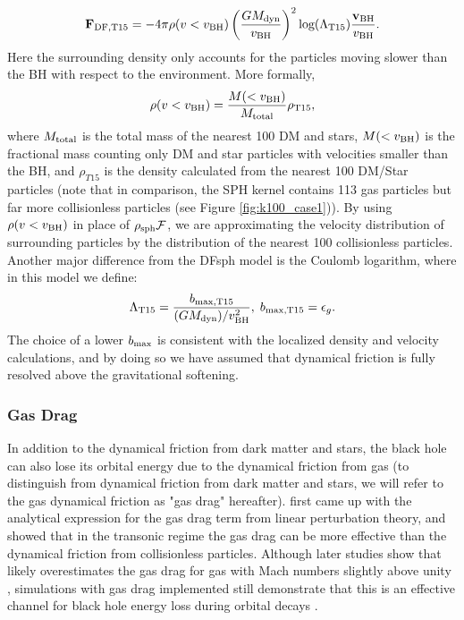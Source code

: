 \begin{equation}
    \label{eq:T15}
    \mathbf{F}_{\rm DF,T15} = -4\pi \rho (v<v_{\rm BH}) \left(\frac{GM_{\rm dyn}}{v_{\rm BH}}\right)^2  \text{log}(\Lambda_{\rm T15}) \frac{\bf{v}_{\rm BH}}{v_{\rm BH}}.
\end{equation}
Here the surrounding density only accounts for the particles moving slower than the BH with respect to the environment. More formally,
\begin{equation}
\label{eq:rho}
    \rho (v<v_{\rm BH}) = \frac{M(<v_{\rm BH})}{M_{\rm total}} \rho_{\rm T15},
\end{equation}
where $M_{\rm total}$ is the total mass of the nearest 100 DM and stars, $M(<v_{\rm BH})$ is the fractional mass counting only DM and star particles with velocities smaller than the BH, and $\rho_{T15}$ is the density calculated from the nearest 100 DM/Star particles (note that in comparison, the SPH kernel contains 113 gas particles but far more collisionless particles (see Figure \ref{fig:k100_case1})). By using $\rho (v<v_{\rm BH})$ in place of $\rho_{\rm sph} \mathcal{F}$, we are approximating the velocity distribution of surrounding particles by the distribution of the nearest 100 collisionless particles. Another major difference from the DFsph model is the Coulomb logarithm, where in this model we define:
\begin{equation}
    \Lambda_{\rm T15} = \frac{b_{\rm max,T15}}{(GM_{\rm dyn})/v_{\rm BH}^2}, \; b_{\rm max,T15} = \epsilon_g.
\end{equation}
The choice of a lower $b_{\rm max}$ is consistent with the localized density and velocity calculations, and by doing so we have assumed that dynamical friction is fully resolved above the gravitational softening.


\subsubsection{Gas Drag}
\label{subsection:drag}
In addition to the dynamical friction from dark matter and stars, the black hole can also lose its orbital energy due to the dynamical friction from gas (to distinguish from dynamical friction from dark matter and stars, we will refer to the gas dynamical friction as "gas drag" hereafter). \cite{Ostriker1999} first came up with the analytical expression for the gas drag term from linear perturbation theory, and showed that in the transonic regime the gas drag can be more effective than the dynamical friction from collisionless particles. Although later studies show that \cite{Ostriker1999} likely overestimates the gas drag for gas with Mach numbers slightly above unity \citep[e.g.][]{Escala2004ApJ,Chapon2013}, simulations with gas drag implemented still demonstrate that this is an effective channel for black hole energy loss during orbital decays \citep[e.g.][]{Chapon2013,Dubois2013,Pfister2019}.

